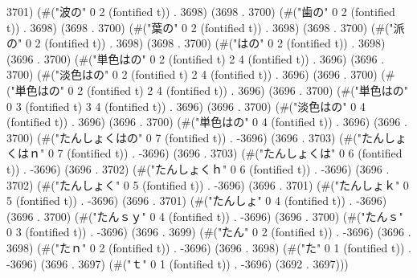 3701) (#("波の" 0 2 (fontified t)) . 3698) (3698 . 3700) (#("歯の" 0 2 (fontified t)) . 3698) (3698 . 3700) (#("葉の" 0 2 (fontified t)) . 3698) (3698 . 3700) (#("派の" 0 2 (fontified t)) . 3698) (3698 . 3700) (#("はの" 0 2 (fontified t)) . 3698) (3696 . 3700) (#("単色はの" 0 2 (fontified t) 2 4 (fontified t)) . 3696) (3696 . 3700) (#("淡色はの" 0 2 (fontified t) 2 4 (fontified t)) . 3696) (3696 . 3700) (#("単色はの" 0 2 (fontified t) 2 4 (fontified t)) . 3696) (3696 . 3700) (#("単色はの" 0 3 (fontified t) 3 4 (fontified t)) . 3696) (3696 . 3700) (#("淡色はの" 0 4 (fontified t)) . 3696) (3696 . 3700) (#("単色はの" 0 4 (fontified t)) . 3696) (3696 . 3700) (#("たんしょくはの" 0 7 (fontified t)) . -3696) (3696 . 3703) (#("たんしょくはｎ" 0 7 (fontified t)) . -3696) (3696 . 3703) (#("たんしょくは" 0 6 (fontified t)) . -3696) (3696 . 3702) (#("たんしょくｈ" 0 6 (fontified t)) . -3696) (3696 . 3702) (#("たんしょく" 0 5 (fontified t)) . -3696) (3696 . 3701) (#("たんしょｋ" 0 5 (fontified t)) . -3696) (3696 . 3701) (#("たんしょ" 0 4 (fontified t)) . -3696) (3696 . 3700) (#("たんｓｙ" 0 4 (fontified t)) . -3696) (3696 . 3700) (#("たんｓ" 0 3 (fontified t)) . -3696) (3696 . 3699) (#("たん" 0 2 (fontified t)) . -3696) (3696 . 3698) (#("たｎ" 0 2 (fontified t)) . -3696) (3696 . 3698) (#("た" 0 1 (fontified t)) . -3696) (3696 . 3697) (#("ｔ" 0 1 (fontified t)) . -3696) (3692 . 3697)))

